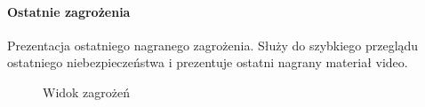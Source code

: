 \paragraph{Ostatnie zagrożenia}
Prezentacja ostatniego nagranego zagrożenia. Służy do szybkiego przeglądu ostatniego niebezpieczeństwa i prezentuje ostatni nagrany materiał video.
\nopagebreak
\begin{figure}[H]
    \centering
    \hfill
    \hfill
    \caption{Widok zagrożeń}
    \label{fig:zagrozenia}
\end{figure}
\pagebreak


